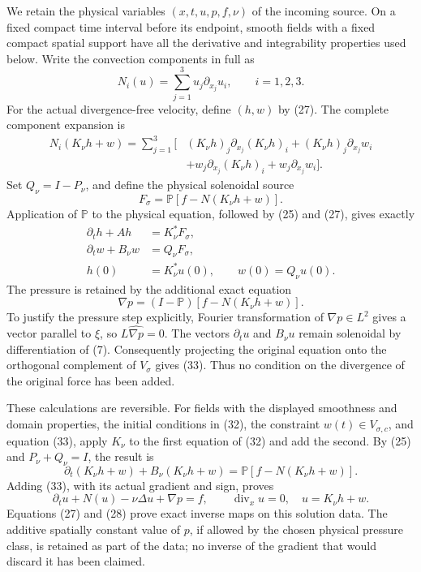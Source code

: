 We retain the physical variables \((x,t,u,p,f,\nu)\) of the incoming source. On a fixed compact time interval before its endpoint, smooth fields with a fixed compact spatial support have all the derivative and integrability properties used below. Write the convection components in full as \[
N_i(u)=\sum_{j=1}^3u_j\partial_{x_j}u_i,\qquad i=1,2,3.
\tag{29}
\] For the actual divergence-free velocity, define \((h,w)\) by (27). The complete component expansion is \[
\begin{aligned}
N_i(K_\nu h+w)=\sum_{j=1}^3\big[&
(K_\nu h)_j\partial_{x_j}(K_\nu h)_i
+(K_\nu h)_j\partial_{x_j}w_i\\
&+w_j\partial_{x_j}(K_\nu h)_i
+w_j\partial_{x_j}w_i\big].
\end{aligned}
\tag{30}
\] Set \(Q_\nu=I-P_\nu\), and define the physical solenoidal source \[
F_\sigma=\mathbb P[f-N(K_\nu h+w)].
\tag{31}
\] Application of \(\mathbb P\) to the physical equation, followed by (25) and (27), gives exactly \[
\begin{aligned}
\partial_t h+Ah&=K_\nu^*F_\sigma,\\
\partial_t w+B_\nu w&=Q_\nu F_\sigma,\\
h(0)&=K_\nu^*u(0),\qquad w(0)=Q_\nu u(0).
\end{aligned}
\tag{32}
\] The pressure is retained by the additional exact equation \[
\nabla p=(I-\mathbb P)[f-N(K_\nu h+w)].
\tag{33}
\] To justify the pressure step explicitly, Fourier transformation of \(\nabla p\in L^2\) gives a vector parallel to \(\xi\), so \(L\widehat{\nabla p}=0\). The vectors \(\partial_tu\) and \(B_\nu u\) remain solenoidal by differentiation of (7). Consequently projecting the original equation onto the orthogonal complement of \(V_\sigma\) gives (33). Thus no condition on the divergence of the original force has been added.

These calculations are reversible. For fields with the displayed smoothness and domain properties, the initial conditions in (32), the constraint \(w(t)\in V_{\sigma,c}\), and equation (33), apply \(K_\nu\) to the first equation of (32) and add the second. By (25) and \(P_\nu+Q_\nu=I\), the result is \[
\partial_t(K_\nu h+w)+B_\nu(K_\nu h+w)=\mathbb P[f-N(K_\nu h+w)].
\tag{34}
\] Adding (33), with its actual gradient and sign, proves \[
\partial_tu+N(u)-\nu\Delta u+\nabla p=f,
\qquad \operatorname{div}_xu=0,
\quad u=K_\nu h+w.
\tag{35}
\] Equations (27) and (28) prove exact inverse maps on this solution data. The additive spatially constant value of \(p\), if allowed by the chosen physical pressure class, is retained as part of the data; no inverse of the gradient that would discard it has been claimed.

